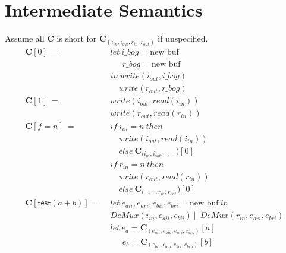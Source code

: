 \documentclass[12pt, letterpaper]{article}
\begin{document}
\section{Intermediate Semantics}
    Assume all $\mathbf{C}$ is short for $\mathbf{C}_{(i_{in},i_{out},r_{in},r_{out})}$ if unspecified.
    {\fontsize{12pt}{14pt}\selectfont
     \begin{align*}
         \mathbf{C}[0]\ 
             =\ &
             let\ i\_bog = \text{new buf}\\
             &\quad\ \ r\_bog = \text{new buf}\\
             &in\ write(i_{out}, i\_bog)\\
             &\quad  write(r_{out}, r\_bog)\\
         \mathbf{C}[1]\ 
             =\ &
             write(i_{out}, read(i_{in}))\\
             &write(r_{out}, read(r_{in}))
             \\
         \mathbf{C}[f = n]\
            =\
            &if\ i_{in}=n\ then\\
            &\quad write(i_{out}, read(i_{in}))\\
            &\quad else\ \mathbf{C}_{(i_{in}, i_{out}, -, -})[0]\\
            &if\ r_{in}=n\ then\\
            &\quad write(r_{out}, read(r_{in}))\\
            &\quad else\ \mathbf{C}_{(-, -, r_{in}, r_{out}})[0]\\
         \mathbf{C}[\mathsf{test}(a + b)]\ 
             =\ &
             let\ e_{aii}, e_{ari}, e_{bii}, e_{bri} = \text{new buf}\ in\\
                &DeMux(i_{in}, e_{aii}, e_{bii})\ ||\ DeMux(r_{in}, e_{ari}, e_{bri})\\
             &let\ e_a = \mathbf{C}_{(e_{aii},e_{aio},e_{ari},e_{aro})}[a]\\
             &\quad\ \ e_b = \mathbf{C}_{(e_{bii},e_{bio},e_{bri},e_{bro})}[b]\\

\end{align*}}
\end{document}
